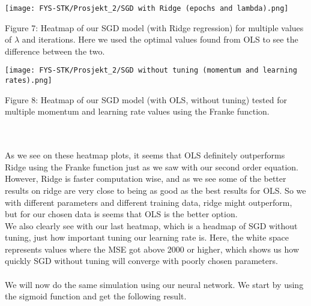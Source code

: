 \documentclass[english,notitlepage,reprint,nofootinbib]{revtex4-1}  %
\begin{document}
\texttt{[image: FYS-STK/Prosjekt\_2/SGD with Ridge (epochs and lambda).png]}
\caption{Figure 7: Heatmap of our SGD model (with Ridge regression) for multiple values of $\lambda$ and iterations. Here we used the optimal values found from OLS to see the difference between the two.}

\texttt{[image: FYS-STK/Prosjekt\_2/SGD without tuning (momentum and learning rates).png]}
\caption{Figure 8: Heatmap of our SGD model (with OLS, without tuning) tested for multiple momentum and learning rate values using the Franke function.}
\\
\\
As we see on these heatmap plots, it seems that OLS definitely outperforms Ridge using the Franke function just as we saw with our second order equation. However, Ridge is faster computation wise, and as we see some of the better results on ridge are very close to being as good as the best results for OLS. So we with different parameters and different training data, ridge might outperform, but for our chosen data is seems that OLS is the better option. 
\\
We also clearly see with our last heatmap, which is a headmap of SGD without tuning, just how important tuning our learning rate is. Here, the white space represents values where the MSE got above 2000 or higher, which shows us how quickly SGD without tuning will converge with poorly chosen parameters.
\\
\\
We will now do the same simulation using our neural network. We start by using the sigmoid function and get the following result.
\end{document}
